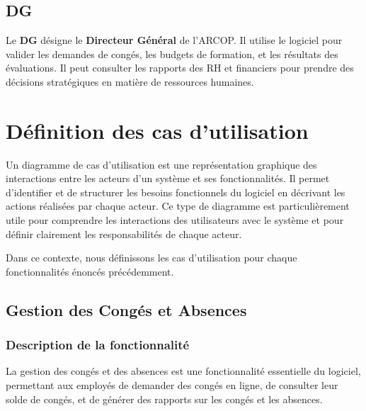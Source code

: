 \subsection{DG}
Le \textbf{DG} désigne le \textbf{Directeur Général} de l'\ac{ARCOP}. Il utilise le logiciel pour valider les demandes de congés, les budgets de formation, et les résultats des évaluations. Il peut consulter les rapports des \ac{RH} et financiers pour prendre des décisions stratégiques en matière de ressources humaines.


\section{D\'efinition des cas d'utilisation}

Un diagramme de cas d'utilisation est une représentation graphique des interactions entre les acteurs d'un système et ses fonctionnalités. Il permet d'identifier et de structurer les besoins fonctionnels du logiciel en décrivant les actions réalisées par chaque acteur. Ce type de diagramme est particulièrement utile pour comprendre les interactions des utilisateurs avec le système et pour définir clairement les responsabilités de chaque acteur.

Dans ce contexte, nous définissons les cas d'utilisation pour chaque fonctionnalités énoncés précédemment.
\subsection{Gestion des Congés et Absences}
\subsubsection{Description de la fonctionnalité}
La gestion des congés et des absences est une fonctionnalité essentielle du logiciel, permettant aux employés de demander des congés en ligne, de consulter leur solde de congés, et de générer des rapports sur les congés et les absences.
